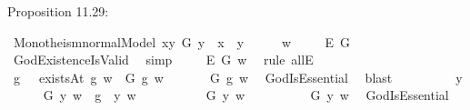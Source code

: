 \begin{isabellebody}
\begin{isamarkuptext}
Proposition 11.29:%
\end{isamarkuptext}\isamarkuptrue%
\isamarkupfalse%
\ Monotheism{\isacharunderscore}normalModel{\isacharcolon}\ {\isachardoublequoteopen}{\isasymlfloor}\isactrlbold {\isasymexists}x{\isachardot}\isactrlbold {\isasymforall}y{\isachardot}\ G\ y\ \isactrlbold {\isasymleftrightarrow}\ x\ \isactrlbold {\isasymapprox}\ y{\isasymrfloor}{\isachardoublequoteclose}\isanewline
%
\isadelimproof
%
\endisadelimproof
%
\isatagproof
{}\isamarkupfalse%
\ {\isacharminus}\isanewline
\isacommand{{\isacharbraceleft}}\isamarkupfalse%
\isanewline
\ \ \isamarkupfalse%
\ w\ \isanewline
\ \ \isamarkupfalse%
\ {\isachardoublequoteopen}{\isasymlfloor}\isactrlbold {\isasymexists}\isactrlsup E\ G{\isasymrfloor}{\isachardoublequoteclose}\ \isamarkupfalse%
\ GodExistenceIsValid\ \isamarkupfalse%
\ simp\ %
\isanewline
\ \ \isamarkupfalse%
\ {\isachardoublequoteopen}{\isacharparenleft}\isactrlbold {\isasymexists}\isactrlsup E\ G{\isacharparenright}\ w{\isachardoublequoteclose}\ \isamarkupfalse%
\ {\isacharparenleft}rule\ allE{\isacharparenright}\ \ \ \ \ \ \ \isanewline
\ \ \isamarkupfalse%
\ \isamarkupfalse%
\ g\ \ {}{\isacharcolon}\ {\isachardoublequoteopen}existsAt\ g\ w\ {\isasymand}\ G\ g\ w{\isachardoublequoteclose}\ \isacommand{{\isachardot}{\isachardot}}\isamarkupfalse%
\isanewline
\ \ \isamarkupfalse%
\ {}{\isacharcolon}\ {\isachardoublequoteopen}{\isasymE}\ G\ g\ w{\isachardoublequoteclose}\ \isamarkupfalse%
\ GodIsEssential\ \isamarkupfalse%
\ blast\ %
\isanewline
\ \ \isacommand{{\isacharbraceleft}}\isamarkupfalse%
\isanewline
\ \ \ \ \isamarkupfalse%
\ y\isanewline
\ \ \ \ \isamarkupfalse%
\ {\isachardoublequoteopen}G\ y\ w\ {\isasymlongleftrightarrow}\ {\isacharparenleft}g\ \isactrlbold {\isasymapprox}\ y{\isacharparenright}\ w{\isachardoublequoteclose}\ \isamarkupfalse%
\ \isanewline
\ \ \ \ \ \ \isamarkupfalse%
\ {\isachardoublequoteopen}G\ y\ w{\isachardoublequoteclose}\isanewline
\ \ \ \ \ \ \isamarkupfalse%
\ {}{\isacharcolon}\ {\isachardoublequoteopen}{\isasymE}\ G\ y\ w{\isachardoublequoteclose}\ \isamarkupfalse%
\ GodIsEssential\ \isamarkupfalse%

\end{isabellebody}
